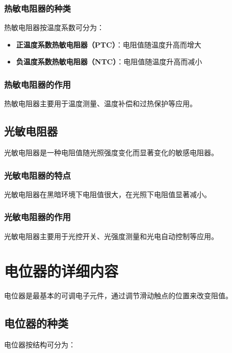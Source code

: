 \documentclass[12pt,UTF8]{ctexbook}
\begin{document}
\subsubsection{热敏电阻器的种类}

热敏电阻器按温度系数可分为：

\begin{itemize}[leftmargin=2cm]
	\item \textbf{正温度系数热敏电阻器（PTC）}：电阻值随温度升高而增大
	\item \textbf{负温度系数热敏电阻器（NTC）}：电阻值随温度升高而减小
\end{itemize}

\subsubsection{热敏电阻器的作用}

热敏电阻器主要用于温度测量、温度补偿和过热保护等应用。

\subsection{光敏电阻器}

光敏电阻器是一种电阻值随光照强度变化而显著变化的敏感电阻器。

\subsubsection{光敏电阻器的特点}

光敏电阻器在黑暗环境下电阻值很大，在光照下电阻值显著减小。

\subsubsection{光敏电阻器的作用}

光敏电阻器主要用于光控开关、光强度测量和光电自动控制等应用。

\section{电位器的详细内容}

电位器是最基本的可调电子元件，通过调节滑动触点的位置来改变阻值。

\subsection{电位器的种类}

电位器按结构可分为：
\end{document}
